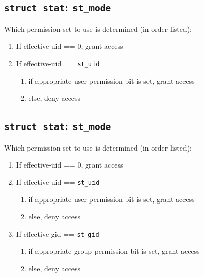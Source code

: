 \documentclass[xga]{xdvislides}
\begin{document}
\subsection{{\tt struct stat}: {\tt st\_mode}}
Which permission set to use is determined (in order listed):
\begin{enumerate}
	\item If effective-uid == 0, grant access
	\item If effective-uid == {\tt st\_uid}
		\begin{enumerate}
			\item if appropriate user permission bit is set, grant access
			\item else, deny access
		\end{enumerate}
\end{enumerate}

\subsection{{\tt struct stat}: {\tt st\_mode}}
Which permission set to use is determined (in order listed):
\begin{enumerate}
	\item If effective-uid == 0, grant access
	\item If effective-uid == {\tt st\_uid}
		\begin{enumerate}
			\item if appropriate user permission bit is set, grant access
			\item else, deny access
		\end{enumerate}
	\item If effective-gid == {\tt st\_gid}
		\begin{enumerate}
			\item if appropriate group permission bit is set, grant access
			\item else, deny access
		\end{enumerate}
\end{enumerate}
\end{document}
